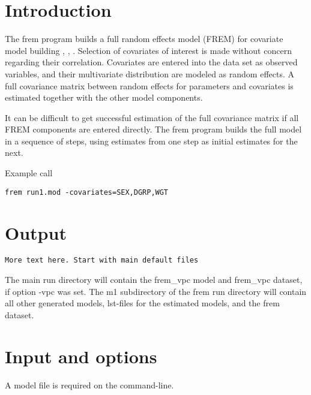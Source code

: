 



\newcommand{\guidetoolname}{frem}

\maketitle

\section{Introduction}
The frem program builds a full random effects model (FREM) for covariate model building
 \cite{Karlsson}, \cite{Ivaturi}, \cite{Yun}.
Selection of covariates of interest is made without concern regarding their correlation.
Covariates are entered into the data set as observed variables, and their multivariate distribution are modeled
as random effects. A full covariance matrix between random effects for parameters and covariates is estimated
together with the other model components.

It can be difficult to get successful estimation of the full covariance matrix
if all FREM components are entered directly. The frem program builds the
full model in a sequence of steps,
using estimates from one step as initial estimates for the next.

Example call
\begin{verbatim}
frem run1.mod -covariates=SEX,DGRP,WGT
\end{verbatim}

\section{Output}

{\Large \texttt{More text here. Start with main default files}}

The main run directory will contain the frem\_vpc model and frem\_vpc dataset, if option -vpc was set.
The m1 subdirectory of the frem run directory will contain all other generated models, 
lst-files for the estimated models, and the frem dataset. 

\section{Input and options}
A model file is required on the command-line.

